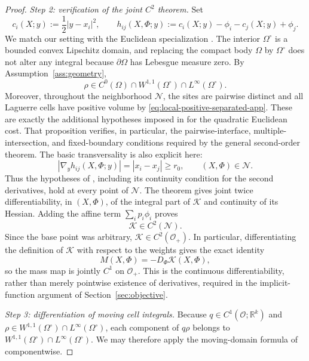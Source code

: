 \documentclass[11pt]{article}
\def\R{\mathbb{R}}
\def\Nc{{\mathcal N}}
\def\Oc{{\mathcal O}}
\newcommand{\Kant}{\mathscr K}
\theoremstyle{definition}
\theoremstyle{remark}
\numberwithin{equation}{section}
\begin{document}
\begin{proof}
\smallskip
\noindent\textit{Step 2: verification of the joint $C^2$ theorem.}
Set
\[
 c_i(X;y):=\frac12|y-x_i|^2,
 \qquad
 h_{ij}(X,\Phi;y):=c_i(X;y)-\phi_i-c_j(X;y)+\phi_j.
\]
We match our setting with the Euclidean specialization
\cite[Proposition~1.1]{deGournayKahnLebrat2019}.  The interior
$\Omega^\circ$ is a bounded convex Lipschitz domain, and replacing the compact body $\Omega$ by
$\Omega^\circ$ does not alter any integral because $\partial\Omega$ has Lebesgue measure zero.  By
Assumption~\ref{ass:geometry},
\[
 \rho\in C^0(\Omega)\cap W^{1,1}(\Omega^\circ)\cap L^\infty(\Omega^\circ).
\]
Moreover, throughout the neighborhood $\Nc$, the sites are pairwise distinct and all Laguerre cells
have positive volume by \eqref{eq:local-positive-separated-app}.  These are exactly the additional
hypotheses imposed in \cite[Proposition~1.1]{deGournayKahnLebrat2019} for the quadratic Euclidean
cost.  That proposition verifies, in particular, the pairwise-interface, multiple-intersection, and
fixed-boundary conditions required by the general second-order theorem.  The basic transversality is
also explicit here:
\begin{equation}\label{eq:transversality-app}
 |\nabla_yh_{ij}(X,\Phi;y)|
 =|x_i-x_j|
 \ge r_0,
 \qquad (X,\Phi)\in\Nc.
\end{equation}
Thus the hypotheses of \cite[Theorem~1]{deGournayKahnLebrat2019}, including its continuity
condition for the second derivatives, hold at every point of $\Nc$.  The theorem gives joint twice
differentiability, in $(X,\Phi)$, of the integral part of $\Kant$ and continuity of its Hessian.
Adding the affine term $\sum_i p_i\phi_i$ proves
\[
 \Kant\in C^2(\Nc).
\]
Since the base point was arbitrary, $\Kant\in C^2(\Oc_+)$.  In particular, differentiating the
definition of $\Kant$ with respect to the weights gives the exact identity
\[
 M(X,\Phi)=-D_\Phi\Kant(X,\Phi),
\]
so the mass map is jointly $C^1$ on $\Oc_+$.  This is the continuous differentiability, rather than
merely pointwise existence of derivatives, required in the implicit-function argument of
Section~\ref{sec:objective}.

\smallskip
\noindent\textit{Step 3: differentiation of moving cell integrals.}
Because $q\in C^1(\Oc;\R^k)$ and $\rho\in W^{1,1}(\Omega^\circ)\cap L^\infty(\Omega^\circ)$,
each component of $q\rho$ belongs to
$W^{1,1}(\Omega^\circ)\cap L^\infty(\Omega^\circ)$.  We may therefore apply the moving-domain
formula of \cite[Lemmas~1.1--1.2]{deGournayKahnLebrat2019} componentwise.


\end{proof}
\end{document}
